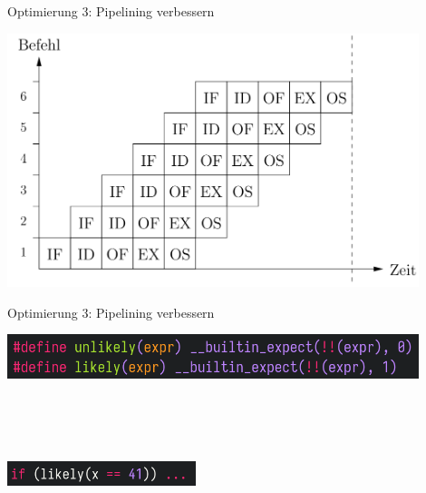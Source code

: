 \documentclass{beamer}
\begin{document}
%
%
%
\begin{frame}{Optimierung 3: Pipelining verbessern}
\centerline{\includegraphics[width=12cm]{if2.png}}
\end{frame}

\begin{frame}{Optimierung 3: Pipelining verbessern}
\centerline{\includegraphics[width=12cm]{likely1.png}}
~\\~\\~\pause~
\centerline{\includegraphics[width=5.5cm]{likely2.png}}
\end{frame}
\end{document}
